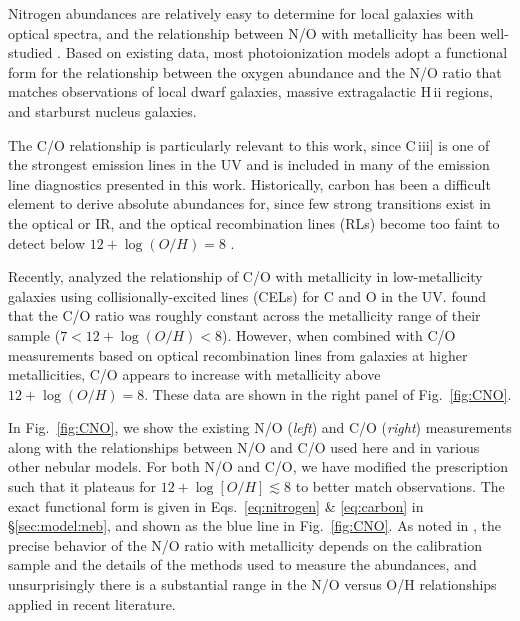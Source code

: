 \documentclass[preprint2,trackchanges]{aastex62}
\newcommand{\hii}{H\,{\sc ii}\xspace}
\newcommand{\ciii}{C\,{\sc iii}]\xspace}
\begin{document}
Nitrogen abundances are relatively easy to determine for local galaxies with optical spectra, and the relationship between N/O with metallicity has been well-studied \citep[e.g.,][]{Garnett+1990, vanZee+1998, Berg+2012}. Based on existing data, most photoionization models adopt a functional form for the relationship between the oxygen abundance and the N/O ratio that matches observations of local dwarf galaxies, massive extragalactic \hii regions, and starburst nucleus galaxies.

The C/O relationship is particularly relevant to this work, since \ciii is one of the strongest emission lines in the UV and is included in many of the emission line diagnostics presented in this work. Historically, carbon has been a difficult element to derive absolute abundances for, since few strong transitions exist in the optical or IR, and the optical recombination lines (RLs) become too faint to detect below $12+\log(O/H)=8$ \citep{Esteban+2014}.

Recently, \citet{Berg+2016} analyzed the relationship of C/O with metallicity in low-metallicity galaxies using collisionally-excited lines (CELs) for C and O in the UV. \citet{Berg+2016} found that the C/O ratio was roughly constant across the metallicity range of their sample ($7<12+\log(O/H)<8$). However, when combined with C/O measurements based on optical recombination lines from galaxies at higher metallicities, C/O appears to increase with metallicity above $12+\log(O/H)=8$. These data are shown in the right panel of Fig.~\ref{fig:CNO}.

In Fig.~\ref{fig:CNO}, we show the existing N/O (\emph{left}) and C/O (\emph{right}) measurements along with the relationships between N/O and C/O used here and in various other nebular models. For both N/O and C/O, we have modified the \citet{Dopita+2013} prescription such that it plateaus for $12+\log[ O/H ] \lesssim 8$ to better match observations. The exact functional form is given in Eqs.~\ref{eq:nitrogen} \& \ref{eq:carbon} in \S\ref{sec:model:neb}, and shown as the blue line in Fig.~\ref{fig:CNO}. As noted in \citet{Steidel+2014}, the precise behavior of the N/O ratio with metallicity depends on the calibration sample and the details of the methods used to measure the abundances, and unsurprisingly there is a substantial range in the N/O versus O/H relationships applied in recent literature.
\end{document}
